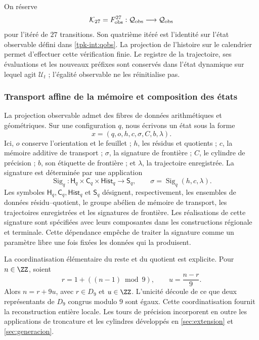 On réserve
\[
 \mathcal K_{27}=F_{\rm obs}^{27}:
 \mathcal Q_{\rm obs}\longrightarrow\mathcal Q_{\rm obs}
\]
pour l'itéré de \(27\) transitions. Son quatrième itéré est l'identité sur l'état observable défini dans \eqref{tpk-int:qobs}. La projection de l'histoire sur le calendrier permet d'effectuer cette vérification finie. Le registre de la trajectoire, ses évaluations et les nouveaux préfixes sont conservés dans l'état dynamique sur lequel agit \(\mathcal U_t\) ; l'égalité observable ne les réinitialise pas.

\subsubsection{Transport affine de la mémoire et composition des états}
\label{tpk-int:memoria}

La projection observable admet des fibres de données arithmétiques et géométriques.
Sur une configuration \(q\), nous écrivons un état sous la forme
\[
 x=(q,o,h,c,\sigma,C,b,\lambda).
\]
Ici, \(o\) conserve l'orientation et le feuillet ; \(h\), les résidus
et quotients ; \(c\), la mémoire additive de transport ; \(\sigma\),
la signature de frontière ; \(C\), le cylindre de précision ; \(b\), son
étiquette de frontière ; et \(\lambda\), la trajectoire enregistrée. La
signature est déterminée par une application
\[
 \operatorname{Sig}_q:
 \mathsf H_q\times\mathsf C_q\times\mathsf{Hist}_q
 \longrightarrow\mathsf S_q,
 \qquad \sigma=\operatorname{Sig}_q(h,c,\lambda).
\]
Les symboles \(\mathsf H_q,\mathsf C_q,\mathsf{Hist}_q\) et
\(\mathsf S_q\) désignent, respectivement, les ensembles de données
résidu--quotient, le groupe abélien de mémoire de transport, les
trajectoires enregistrées et les signatures de frontière.
Les réalisations de cette signature sont spécifiées avec leurs composantes dans
les constructions régionale et terminale. Cette dépendance empêche de traiter
la signature comme un paramètre libre une fois fixées les données qui la produisent.

La coordinatisation élémentaire du reste et du quotient est explicite. Pour
\(n\in\ZZ\), soient
\[
 r=1+((n-1)\bmod9),\qquad u=\frac{n-r}{9}.
\]
Alors \(n=r+9u\), avec \(r\in D_9\) et \(u\in\ZZ\).
L'unicité découle de ce que deux représentants de \(D_9\) congrus
modulo \(9\) sont égaux. Cette coordinatisation fournit la reconstruction
entière locale. Les tours de précision incorporent en outre les applications
de troncature et les cylindres développés en
\ref{sec:extension} et \ref{sec:generacion}.

